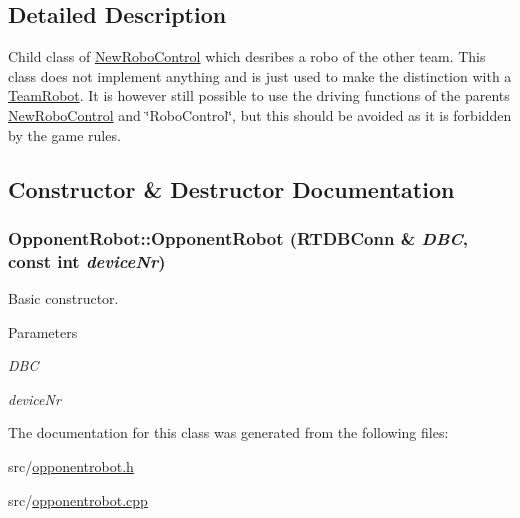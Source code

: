 \subsection{Detailed Description}
Child class of \hyperlink{classNewRoboControl}{NewRoboControl} which desribes a robo of the other team. This class does not implement anything and is just used to make the distinction with a \hyperlink{classTeamRobot}{TeamRobot}. It is however still possible to use the driving functions of the parents \hyperlink{classNewRoboControl}{NewRoboControl} and \char`\"{}RoboControl\char`\"{}, but this should be avoided as it is forbidden by the game rules. 

\subsection{Constructor \& Destructor Documentation}
\hypertarget{classOpponentRobot_a315c08a9f17d278b1bb8067929b38f83}{
\subsubsection[{OpponentRobot}]{\setlength{\rightskip}{0pt plus 5cm}OpponentRobot::OpponentRobot (RTDBConn \& {\em DBC}, \/  const int {\em deviceNr})}}
\label{classOpponentRobot_a315c08a9f17d278b1bb8067929b38f83}


Basic constructor. 


\begin{DoxyParams}{Parameters}
\item[{\em DBC}]\item[{\em deviceNr}]\end{DoxyParams}


The documentation for this class was generated from the following files:\begin{DoxyCompactItemize}
\item 
src/\hyperlink{opponentrobot_8h}{opponentrobot.h}\item 
src/\hyperlink{opponentrobot_8cpp}{opponentrobot.cpp}\end{DoxyCompactItemize}
